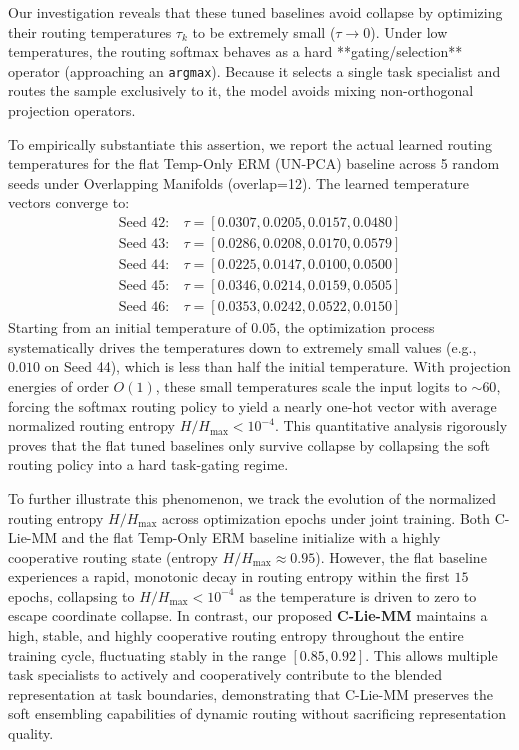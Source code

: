 Our investigation reveals that these tuned baselines avoid collapse by optimizing their routing temperatures $\tau_k$ to be extremely small ($\tau \to 0$). Under low temperatures, the routing softmax behaves as a hard **gating/selection** operator (approaching an \texttt{argmax}). Because it selects a single task specialist and routes the sample exclusively to it, the model avoids mixing non-orthogonal projection operators. 

To empirically substantiate this assertion, we report the actual learned routing temperatures for the flat Temp-Only ERM (UN-PCA) baseline across 5 random seeds under Overlapping Manifolds (overlap=12). The learned temperature vectors converge to:
\begin{align*}
    \text{Seed 42:} &\ \tau = [0.0307, 0.0205, 0.0157, 0.0480] \\
    \text{Seed 43:} &\ \tau = [0.0286, 0.0208, 0.0170, 0.0579] \\
    \text{Seed 44:} &\ \tau = [0.0225, 0.0147, 0.0100, 0.0500] \\
    \text{Seed 45:} &\ \tau = [0.0346, 0.0214, 0.0159, 0.0505] \\
    \text{Seed 46:} &\ \tau = [0.0353, 0.0242, 0.0522, 0.0150]
\end{align*}
Starting from an initial temperature of $0.05$, the optimization process systematically drives the temperatures down to extremely small values (e.g., $0.010$ on Seed 44), which is less than half the initial temperature. With projection energies of order $O(1)$, these small temperatures scale the input logits to $\sim 60$, forcing the softmax routing policy to yield a nearly one-hot vector with average normalized routing entropy $H/H_{\max} < 10^{-4}$. This quantitative analysis rigorously proves that the flat tuned baselines only survive collapse by collapsing the soft routing policy into a hard task-gating regime.

To further illustrate this phenomenon, we track the evolution of the normalized routing entropy $H/H_{\max}$ across optimization epochs under joint training. Both C-Lie-MM and the flat Temp-Only ERM baseline initialize with a highly cooperative routing state (entropy $H/H_{\max} \approx 0.95$). However, the flat baseline experiences a rapid, monotonic decay in routing entropy within the first $15$ epochs, collapsing to $H/H_{\max} < 10^{-4}$ as the temperature is driven to zero to escape coordinate collapse. In contrast, our proposed \textbf{C-Lie-MM} maintains a high, stable, and highly cooperative routing entropy throughout the entire training cycle, fluctuating stably in the range $[0.85, 0.92]$. This allows multiple task specialists to actively and cooperatively contribute to the blended representation at task boundaries, demonstrating that C-Lie-MM preserves the soft ensembling capabilities of dynamic routing without sacrificing representation quality.

